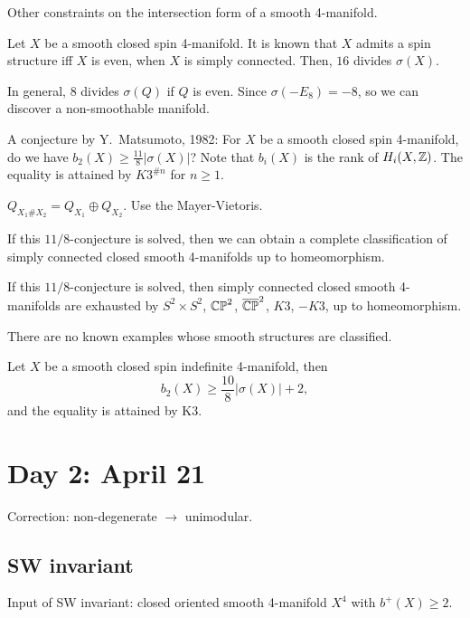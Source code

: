 \documentclass{../../../small}
\begin{document}
Other constraints on the intersection form of a smooth 4-manifold.
\begin{thm}
Let $X$ be a smooth closed spin 4-manifold.
It is known that $X$ admits a spin structure iff $X$ is even, when $X$ is simply connected.
Then, $16$ divides $\sigma(X)$.
\end{thm}

In general, $8$ divides $\sigma(Q)$ if $Q$ is even.
Since $\sigma(-E_8)=-8$, so we can discover a non-smoothable manifold.

A conjecture by Y.~Matsumoto, 1982: For $X$ be a smooth closed spin 4-manifold, do we have $b_2(X)\ge\frac{11}8|\sigma(X)|$? Note that $b_i(X)$ is the rank of $H_i(X,\mathbb{Z})$.
The equality is attained by $K3^{\#n}$ for $n\ge1$.
\begin{exe}
$Q_{X_1\# X_2}=Q_{X_1}\oplus Q_{X_2}$.
Use the Mayer-Vietoris.
\end{exe}

If this $11/8$-conjecture is solved, then we can obtain a complete classification of simply connected closed smooth 4-manifolds up to homeomorphism.

\begin{exe}
If this $11/8$-conjecture is solved, then simply connected closed smooth 4-manifolds are exhausted by $S^2\times S^2$, $\mathbb{CP}^2$, $\overline{\mathbb{CP}}^2$, $K3$, $-K3$, up to homeomorphism.
\end{exe}

There are no known examples whose smooth structures are classified.

\begin{thm}
Let $X$ be a smooth closed spin indefinite 4-manifold, then
\[b_2(X)\ge\frac{10}8|\sigma(X)|+2,\]
and the equality is attained by K3.
\end{thm}







\newpage
\section{Day 2: April 21}


Correction: non-degenerate $\to$ unimodular.
\subsection{SW invariant}

Input of SW invariant: closed oriented smooth 4-manifold $X^4$ with $b^+(X)\ge2$.
\end{document}
